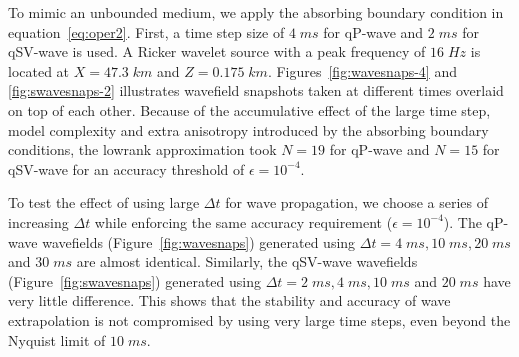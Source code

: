 To mimic an unbounded medium, we apply the absorbing boundary condition in equation~\ref{eq:oper2}. First, a time step size of $4\;ms$ for qP-wave and $2\;ms$ for qSV-wave is used. A Ricker wavelet source with a peak frequency of $16\;Hz$ is located at $X=47.3\;km$ and $Z=0.175\;km$. Figures~\ref{fig:wavesnaps-4} and \ref{fig:swavesnaps-2} illustrates wavefield snapshots taken at different times overlaid on top of each other. Because of the accumulative effect of the large time step, model complexity and extra anisotropy introduced by the absorbing boundary conditions, the lowrank approximation took $N=19$ for qP-wave and $N=15$ for qSV-wave for an accuracy threshold of $\epsilon = 10^{-4}$.

To test the effect of using large $\Delta t$ for wave propagation, we choose a series of increasing $\Delta t$ while enforcing the same accuracy requirement ($\epsilon = 10^{-4}$). The qP-wave wavefields (Figure~\ref{fig:wavesnaps}) generated using $\Delta t=4\;ms, 10\;ms, 20\;ms$ and $30\;ms$ are almost identical. Similarly, the qSV-wave wavefields (Figure~\ref{fig:swavesnaps}) generated using $\Delta t=2\;ms, 4\;ms, 10\;ms$ and $20\;ms$ have very little difference. This shows that the stability and accuracy of wave extrapolation is not compromised by using very large time steps, even beyond the Nyquist limit of $10\;ms$.

